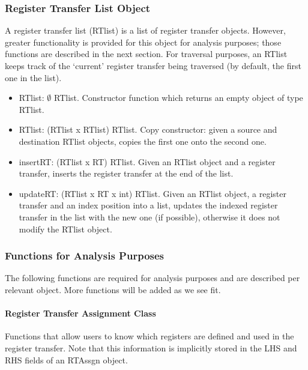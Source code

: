 \subsubsection{Register Transfer List Object}
A register transfer list (RTlist) is a list of register transfer 
objects.  However, greater functionality is provided for this 
object for analysis purposes; those functions are described in the 
next section.
For traversal purposes, an RTlist keeps track of the `current'
register transfer being traversed (by default, the first one
in the list).

\begin{itemize}
\item RTlist: $\emptyset$ \ra RTlist.
    Constructor function which returns an empty object of type RTlist.

\item RTlist: (RTlist x RTlist) \ra RTlist.
    Copy constructor: given a source and destination RTlist 
    objects, copies the first one onto the second one.

\item insertRT: (RTlist x RT) \ra RTlist.
    Given an RTlist object and a register transfer, inserts the
    register transfer at the end of the list.

\item updateRT: (RTlist x RT x int) \ra RTlist.
    Given an RTlist object, a register transfer and an index position into
    a list, updates the indexed register transfer in the list
    with the new one (if possible), otherwise it does not modify
    the RTlist object.
\end{itemize}


\subsubsection{Functions for Analysis Purposes}
The following functions are required for analysis purposes and
are described per relevant object.
More functions will be added as we see fit.


\paragraph{Register Transfer Assignment Class}
Functions that allow users to know which registers are defined
and used in the register transfer.  Note that this information
is implicitly stored in the LHS and RHS fields of an 
RTAssgn object.

